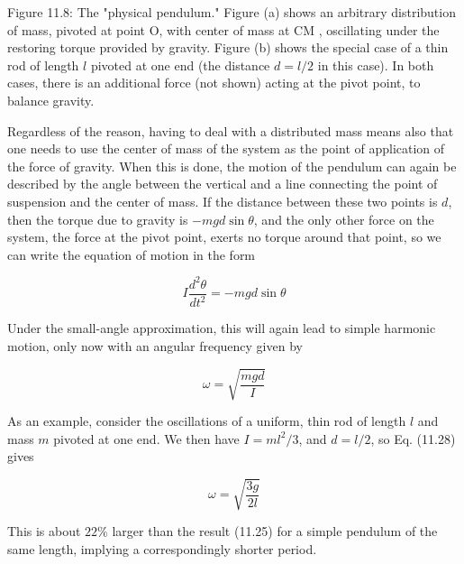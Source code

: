 \documentclass[10pt]{article}
\begin{document}
Figure 11.8: The "physical pendulum." Figure (a) shows an arbitrary distribution of mass, pivoted at point O, with center of mass at CM , oscillating under the restoring torque provided by gravity. Figure (b) shows the special case of a thin rod of length $l$ pivoted at one end (the distance $d=l / 2$ in this case). In both cases, there is an additional force (not shown) acting at the pivot point, to balance gravity.

Regardless of the reason, having to deal with a distributed mass means also that one needs to use the center of mass of the system as the point of application of the force of gravity. When this is done, the motion of the pendulum can again be described by the angle between the vertical and a line connecting the point of suspension and the center of mass. If the distance between these two points is $d$, then the torque due to gravity is $-m g d \sin \theta$, and the only other force on the system, the force at the pivot point, exerts no torque around that point, so we can write the equation of motion in the form


\begin{equation*}
I \frac{d^{2} \theta}{d t^{2}}=-m g d \sin \theta \tag{11.27}
\end{equation*}


Under the small-angle approximation, this will again lead to simple harmonic motion, only now with an angular frequency given by


\begin{equation*}
\omega=\sqrt{\frac{m g d}{I}} \tag{11.28}
\end{equation*}


As an example, consider the oscillations of a uniform, thin rod of length $l$ and mass $m$ pivoted at one end. We then have $I=m l^{2} / 3$, and $d=l / 2$, so Eq. (11.28) gives


\begin{equation*}
\omega=\sqrt{\frac{3 g}{2 l}} \tag{11.29}
\end{equation*}


This is about $22 \%$ larger than the result (11.25) for a simple pendulum of the same length, implying a correspondingly shorter period.
\end{document}
